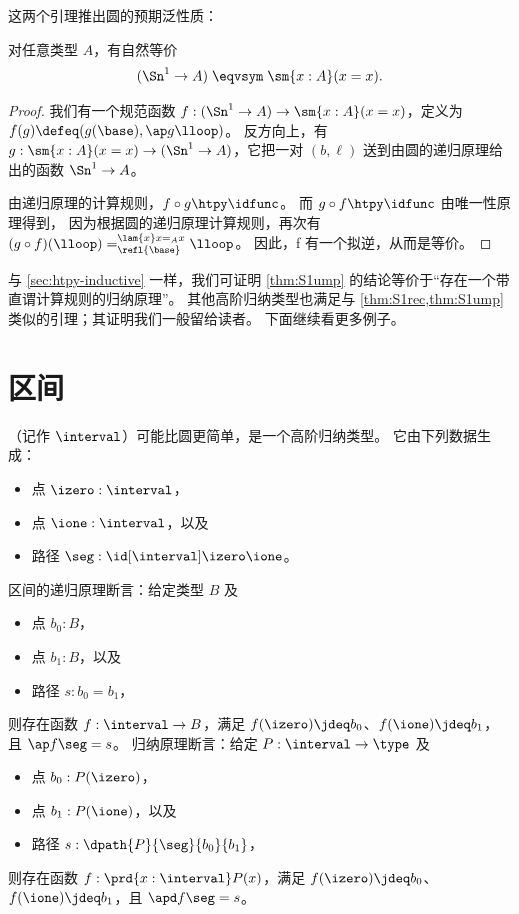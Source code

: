 %
这两个引理推出圆的预期泛性质：

\begin{lem}\label{thm:S1ump}
  对任意类型 $A$，有自然等价
  \[ (\Sn^1 \to A) \;\eqvsym\;
  \sm{x:A} (x=x).
  \]
\end{lem}
\begin{proof}
  我们有一个规范函数 $f:(\Sn^1 \to A) \to \sm{x:A} (x=x)$，定义为 $f(g) \defeq (g(\base),\ap g \lloop)$。
  反方向上，有 $g:\sm{x:A} (x=x) \to (\Sn^1 \to A)$，它把一对 $(b,\ell)$ 送到由圆的递归原理给出的函数 $\Sn^1 \to A$。

  由递归原理的计算规则，$f \circ g \htpy \idfunc$。
  而 $g \circ f \htpy \idfunc$ 由唯一性原理得到，
  因为根据圆的递归原理计算规则，再次有 \((g \circ f)(\lloop) =^{\lam{x} x=_Ax}_{\refl{\base}} \lloop\)。
  因此，f 有一个拟逆，从而是等价。
\end{proof}

%

与 \cref{sec:htpy-inductive} 一样，我们可证明 \cref{thm:S1ump} 的结论等价于“存在一个带直谓计算规则的归纳原理”。
其他高阶归纳类型也满足与 \cref{thm:S1rec,thm:S1ump} 类似的引理；其证明我们一般留给读者。
下面继续看更多例子。
\section{区间}
\label{sec:interval}

%
%
（记作 $\interval$）可能比圆更简单，是一个高阶归纳类型。
它由下列数据生成：
\begin{itemize}
\item 点 $\izero:\interval$，
\item 点 $\ione:\interval$，以及
\item 路径 $\seg : \id[\interval]\izero\ione$。
\end{itemize}
%
区间的递归原理断言：给定类型 $B$ 及
\begin{itemize}
\item 点 $b_0:B$，
\item 点 $b_1:B$，以及
\item 路径 $s:b_0=b_1$，
\end{itemize}
则存在函数 $f:\interval\to B$，满足 $f(\izero)\jdeq b_0$、$f(\ione)\jdeq b_1$，且 $\ap f \seg = s$。
%
归纳原理断言：给定 $P:\interval\to\type$ 及
\begin{itemize}
\item 点 $b_0:P(\izero)$，
\item 点 $b_1:P(\ione)$，以及
\item 路径 $s:\dpath{P}{\seg}{b_0}{b_1}$，
\end{itemize}
则存在函数 $f:\prd{x:\interval} P(x)$，满足 $f(\izero)\jdeq b_0$、$f(\ione)\jdeq b_1$，且 $\apd f \seg = s$。


